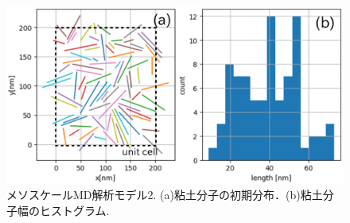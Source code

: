 \begin{figure}[h]
	\begin{center}
	\includegraphics[width=0.8\linewidth]{Figs/fig2.eps} 
	\end{center}
	\caption{
		メソスケールMD解析モデル2. (a)粘土分子の初期分布．(b)粘土分子幅のヒストグラム. 
	} 
	\label{fig:fig2}
\end{figure}
